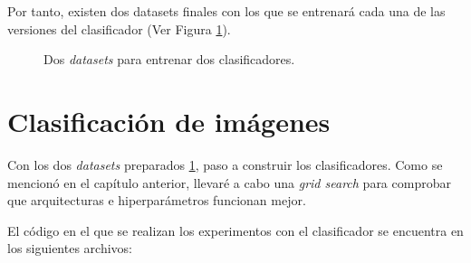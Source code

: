 Por tanto, existen dos datasets finales con los que se entrenará cada una de las versiones del clasificador (Ver Figura \ref{fig:two_final_datasets}).
\begin{figure}[H]
\centering
    \caption{Dos \textit{datasets} para entrenar dos clasificadores.} 
    \label{fig:two_final_datasets}
\end{figure}

\newpage
\section{Clasificación de imágenes}

Con los dos \textit{datasets} preparados \ref{fig:two_final_datasets}, paso a construir los clasificadores. Como se mencionó en el capítulo anterior, llevaré a cabo una \textit{grid search} para comprobar que arquitecturas e hiperparámetros funcionan mejor.

El código en el que se realizan los experimentos con el clasificador se encuentra en los siguientes archivos:

\vspace{0.2cm}

